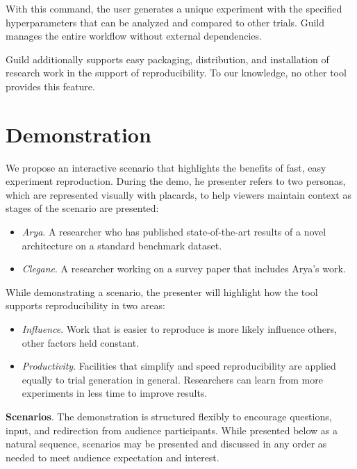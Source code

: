 \documentclass{article}
\begin{document}
With this command, the user generates a unique experiment with the
specified hyperparameters that can be analyzed and compared to other
trials. Guild manages the entire workflow without external
dependencies.

Guild additionally supports easy packaging, distribution, and
installation of research work in the support of reproducibility. To
our knowledge, no other tool provides this feature.

\section{Demonstration}

We propose an interactive scenario that highlights the benefits of
fast, easy experiment reproduction. During the demo, he presenter
refers to two personas, which are represented visually with placards,
to help viewers maintain context as stages of the scenario are
presented:

\begin{itemize}[topsep=3pt]
\item \emph{Arya}. A researcher who has published state-of-the-art
  results of a novel architecture on a standard benchmark dataset.
\item \emph{Clegane}. A researcher working on a survey paper that
  includes Arya's work.
\end{itemize}

While demonstrating a scenario, the presenter will highlight how the
tool supports reproducibility in two areas:

\begin{itemize}[topsep=3pt]
\item \emph{Influence}. Work that is easier to reproduce is more
  likely influence others, other factors held constant.

\item \emph{Productivity}. Facilities that simplify and speed
  reproducibility are applied equally to trial generation in general.
  Researchers can learn from more experiments in less time to improve
  results.
\end{itemize}

\textbf{Scenarios}. The demonstration is structured flexibly to
encourage questions, input, and redirection from audience
participants. While presented below as a natural sequence, scenarios
may be presented and discussed in any order as needed to meet audience
expectation and interest.
\end{document}
